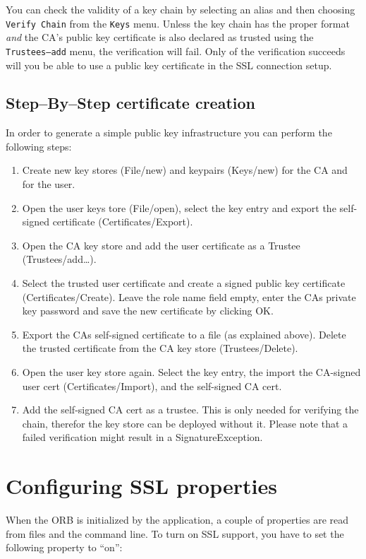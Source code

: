 You can  check the validity of a  key chain by selecting  an alias and
then choosing {\tt Verify Chain}  from the {\tt Keys} menu. Unless the
key  chain  has  the proper  format  {\em  and}  the CA's  public  key
certificate is also declared  as trusted using the {\tt Trustees--add}
menu, the  verification will fail.  Only of  the verification succeeds
will you be able to use a public key certificate in the SSL connection
setup. 

\subsection{Step--By--Step certificate creation}
In  order to  generate  a  simple public  key  infrastructure you  can
perform the following steps:
\begin{enumerate}
\item Create new key stores (File/new) and keypairs (Keys/new) for the CA
and for the user.
\item  Open the  user keys tore (File/open),  select the  key  entry and
export the self-signed certificate (Certificates/Export).
\item  Open  the  CA  key store  and  add the  user  certificate  as  a
Trustee (Trustees/add\dots).
\item Select the  trusted user certificate and create  a signed public
key certificate (Certificates/Create). Leave the role name field empty,
enter the  CAs private  key password and  save the new  certificate by
clicking OK.
\item Export the  CAs self-signed certificate to a  file (as explained
above).    Delete    the    trusted    certificate   from    the    CA
key store (Trustees/Delete).
\item Open the  user key store again. Select the  key entry, the import
the CA-signed  user cert (Certificates/Import), and  the self-signed CA
cert.
\item Add  the self-signed CA cert  as a trustee. This  is only needed
for verifying the chain, therefor the key store can be deployed without
it.  Please  note  that  a  failed  verification  might  result  in  a
SignatureException.
\end{enumerate}

\section{Configuring SSL properties}

When the ORB is initialized by the application, a couple of properties
are read from files and the  command line. To turn on SSL support, you have to
set the following property to ``on'':

